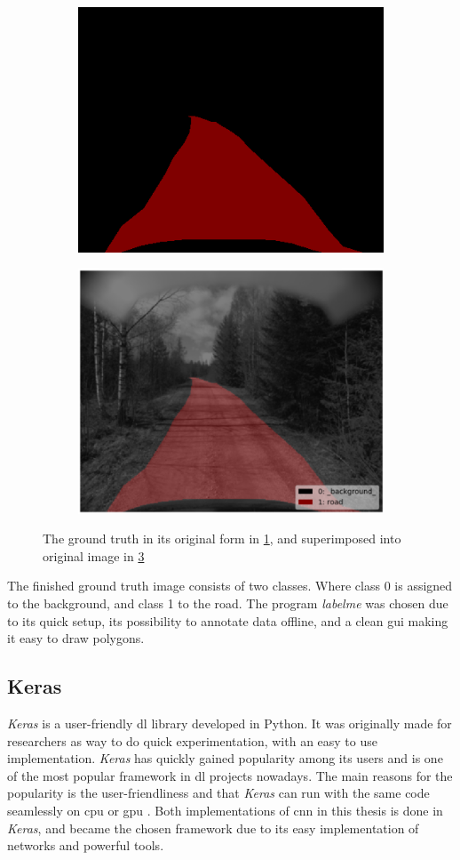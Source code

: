 \documentclass[USenglish]{ifimaster}  %
\begin{document}
\begin{figure}[ht]
\begin{subfigure}{.6\textwidth}
\includegraphics[width=.6\linewidth]{bilder/label_method.png}
\label{fig:gt_method}
\end{subfigure}
\hspace*{\fill} %
\begin{subfigure}{.6\textwidth}
\includegraphics[width=.6\linewidth]{bilder/label_viz_method.png}
\label{fig:superimposed_method}
\end{subfigure}
\caption{The ground truth in its original form in \cref{fig:gt_method}, and superimposed into original image in \cref{fig:superimposed_method}}
\end{figure}

The finished ground truth image consists of two classes. Where class 0 is assigned to the background, and class 1 to the road. The program \textit{labelme} was chosen due to its quick setup, its possibility to annotate data offline, and a clean \ac{gui} making it easy to draw polygons. 
 
\subsection{Keras}
\textit{Keras} is a user-friendly \ac{dl} library developed in Python. It was originally made for researchers as way to do quick experimentation, with an easy to use implementation. \textit{Keras} has quickly gained popularity among its users and is one of the most popular framework in \ac{dl} projects nowadays. The main reasons for the popularity is the user-friendliness and that \textit{Keras} can run with the same code seamlessly on \ac{cpu} or \ac{gpu} \cite{Francois_Deep_learning_with_python}. Both implementations of \ac{cnn} in this thesis is done in \textit{Keras}, and became the chosen framework due to its easy implementation of networks and powerful tools.
\end{document}
